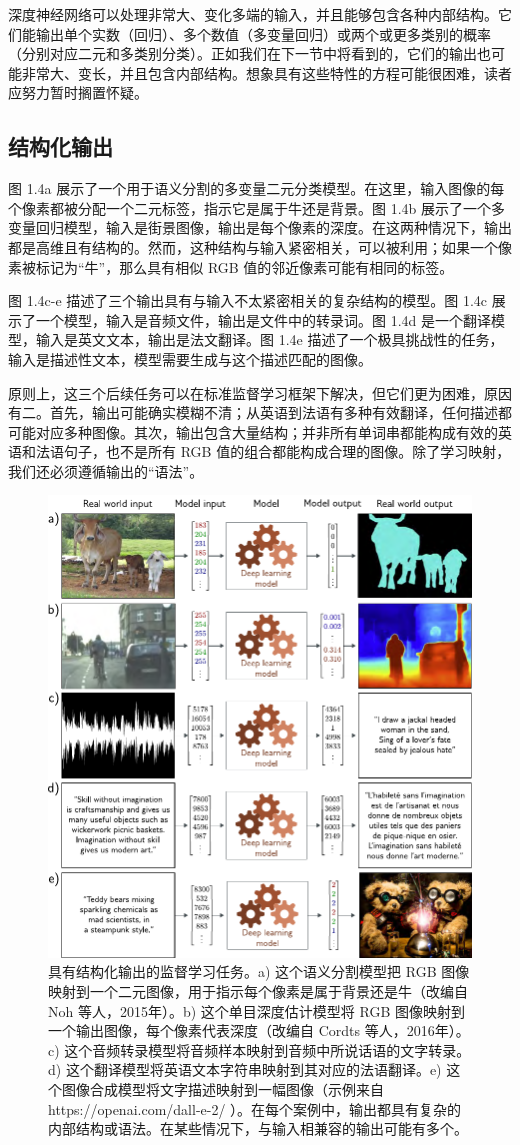 \documentclass[lang=cn,newtx,10pt,scheme=chinese]{elegantbook}
\begin{document}
深度神经网络可以处理非常大、变化多端的输入，并且能够包含各种内部结构。它们能输出单个实数（回归）、多个数值（多变量回归）或两个或更多类别的概率（分别对应二元和多类别分类）。正如我们在下一节中将看到的，它们的输出也可能非常大、变长，并且包含内部结构。想象具有这些特性的方程可能很困难，读者应努力暂时搁置怀疑。

\subsection{结构化输出}
图 1.4a 展示了一个用于语义分割的多变量二元分类模型。在这里，输入图像的每个像素都被分配一个二元标签，指示它是属于牛还是背景。图 1.4b 展示了一个多变量回归模型，输入是街景图像，输出是每个像素的深度。在这两种情况下，输出都是高维且有结构的。然而，这种结构与输入紧密相关，可以被利用；如果一个像素被标记为“牛”，那么具有相似 RGB 值的邻近像素可能有相同的标签。

图 1.4c-e 描述了三个输出具有与输入不太紧密相关的复杂结构的模型。图 1.4c 展示了一个模型，输入是音频文件，输出是文件中的转录词。图 1.4d 是一个翻译模型，输入是英文文本，输出是法文翻译。图 1.4e 描述了一个极具挑战性的任务，输入是描述性文本，模型需要生成与这个描述匹配的图像。

原则上，这三个后续任务可以在标准监督学习框架下解决，但它们更为困难，原因有二。首先，输出可能确实模糊不清；从英语到法语有多种有效翻译，任何描述都可能对应多种图像。其次，输出包含大量结构；并非所有单词串都能构成有效的英语和法语句子，也不是所有 RGB 值的组合都能构成合理的图像。除了学习映射，我们还必须遵循输出的“语法”。

\begin{figure}
	\centering
	\includegraphics[width=0.7\linewidth]{PDFFigures/UDLChap1PDF/IntroModels2a_compressed.pdf}
	\caption{具有结构化输出的监督学习任务。a) 这个语义分割模型把 RGB 图像映射到一个二元图像，用于指示每个像素是属于背景还是牛（改编自 Noh 等人，2015年）。b) 这个单目深度估计模型将 RGB 图像映射到一个输出图像，每个像素代表深度（改编自 Cordts 等人，2016年）。c) 这个音频转录模型将音频样本映射到音频中所说话语的文字转录。d) 这个翻译模型将英语文本字符串映射到其对应的法语翻译。e) 这个图像合成模型将文字描述映射到一幅图像（示例来自 https://openai.com/dall-e-2/ ）。在每个案例中，输出都具有复杂的内部结构或语法。在某些情况下，与输入相兼容的输出可能有多个。}
\end{figure}
\end{document}
